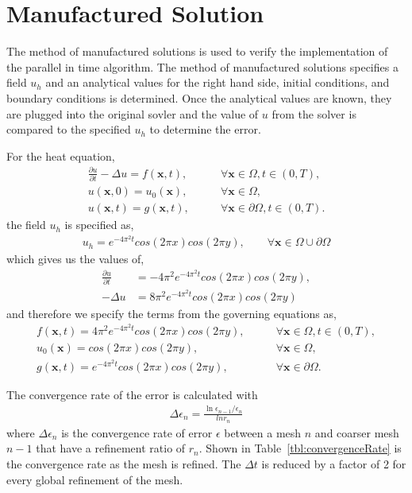 \documentclass{article}
\begin{document}
\section{Manufactured Solution}
\label{sec:MFGSol}

The method of manufactured solutions is used to verify the implementation of the
parallel in time algorithm.
The method of manufactured solutions specifies a field $u_h$ and an
analytical values for the right hand side, initial conditions, and boundary
conditions is determined.
Once the analytical values are known, they are plugged into the original sovler
and the value of $u$ from the solver is compared to the specified $u_h$ to
determine the error.

For the heat equation,
\begin{align*}
  \frac{\partial u}{\partial t} - \Delta u = f(\boldsymbol{x},t), \qquad &\forall\boldsymbol{x}\in\Omega,t\in\left( 0,T \right), \\
  u(\boldsymbol{x},0) = u_0(\boldsymbol{x}), \qquad &\forall \boldsymbol{x}\in\Omega, \\
  u(\boldsymbol{x},t) = g(\boldsymbol{x},t), \qquad &\forall \boldsymbol{x}\in\partial\Omega,t\in\left( 0,T \right).
\end{align*}
the field $u_h$ is specified as,
\begin{align*}
  u_h = e^{-4\pi^2t}cos(2 \pi x)cos(2 \pi y), \qquad \forall \boldsymbol{x} \in \Omega \cup \partial\Omega
\end{align*}
which gives us the values of,
\begin{align*}
  \frac{\partial u}{\partial t} &= -4 \pi^2 e^{-4\pi^2t}cos(2 \pi x)cos(2 \pi y), \\
  -\Delta u &= 8 \pi^2 e^{-4\pi^2t}cos(2 \pi x)cos(2 \pi y)
\end{align*}
and therefore we specify the terms from the governing equations as,
\begin{align*}
  f(\boldsymbol{x},t) = 4 \pi^2 e^{-4\pi^2t}cos(2 \pi x)cos(2 \pi y), \qquad&\forall\boldsymbol{x}\in\Omega,t\in\left( 0,T \right), \\
  u_0(\boldsymbol{x}) = cos(2 \pi x)cos(2 \pi y), \qquad &\forall \boldsymbol{x}\in\Omega, \\
  g(\boldsymbol{x},t) = e^{-4\pi^2t}cos(2 \pi x)cos(2 \pi y), \qquad &\forall \boldsymbol{x} \in \partial\Omega.
\end{align*}

The convergence rate of the error is calculated with
\begin{align*}
  \Delta \epsilon_n = \frac{\ln{\epsilon_{n-1}/\epsilon_{n}}}{ln{r_n}}
\end{align*}
where $\Delta \epsilon_n$ is the convergence rate of error $\epsilon$ between a mesh $n$ and
coarser mesh $n-1$ that have a refinement ratio of $r_n$.
Shown in Table~\ref{tbl:convergenceRate} is the convergence rate as the mesh is
refined.
The $\Delta t$ is reduced by a factor of 2 for every global refinement of the mesh.
\end{document}
